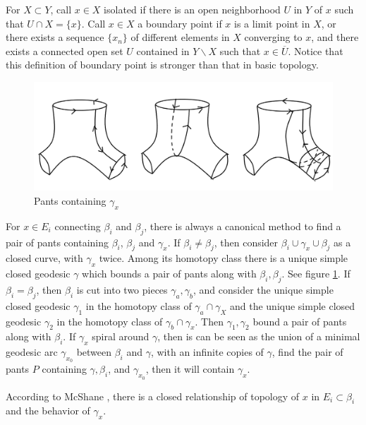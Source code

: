 For $X\subset Y$, call $x\in X$ isolated if there is an open neighborhood $U$ in $Y$ of $x$ such that $U\cap X=\{x\}$. Call $x\in X$ a boundary point if $x$ is a limit point in $X$, or there exists a sequence $\{x_n\}$ of different elements in $X$ converging to $x$, and there exists a connected open set $U$ contained in $Y\backslash X$ such that $x\in \overline{U}$. Notice that this definition of boundary point is stronger than that in basic topology.


 \begin{figure}[h]
     \centering
     \includegraphics[width=5 in ]{picture/findpants.png}
     \caption{Pants containing $\gamma_x$}
     \label{fig:findpants}
 \end{figure}

For $x\in E_i$ connecting $\beta_i$ and $\beta_j$, there is always a canonical  method to find a pair of pants containing $\beta_i$, $\beta_j$ and $\gamma_x$.  If $\beta_i\neq \beta_j$, then consider $\beta_i\cup\gamma_x\cup\beta_j$ as a closed curve, with $\gamma_x$ twice. Among its homotopy class there is a unique simple closed geodesic $\gamma$ which bounds a pair of pants along with $\beta_i,\beta_j$. See figure \ref{fig:findpants}.  If $\beta_i=\beta_j$, then $\beta_i$ is cut into two pieces $\gamma_a,\gamma_b$, and consider the unique simple closed geodesic $\gamma_1$ in the homotopy class of $\gamma_a\cap \gamma_X$ and the unique simple closed geodesic $\gamma_2$ in the homotopy class of $\gamma_b\cap  \gamma_x$. Then $\gamma_1,\gamma_2$ bound a pair of pants along with $\beta_i$. If $\gamma_x$ spiral around $\gamma$, then is can be seen as the union of  a minimal   geodesic arc $\gamma_{x_0}$ between $\beta_i$ and $\gamma$, with an infinite  copies  of $\gamma$, find the pair of pants $P$ containing $\gamma,\beta_i$, and $\gamma_{x_0}$, then it will contain $\gamma_x$.  


According to McShane \cite{McShane1998SimpleGA}, there is a closed relationship   of topology of $x$ in   $ E_i\subset \beta_i$ and the behavior of $\gamma_x$.

